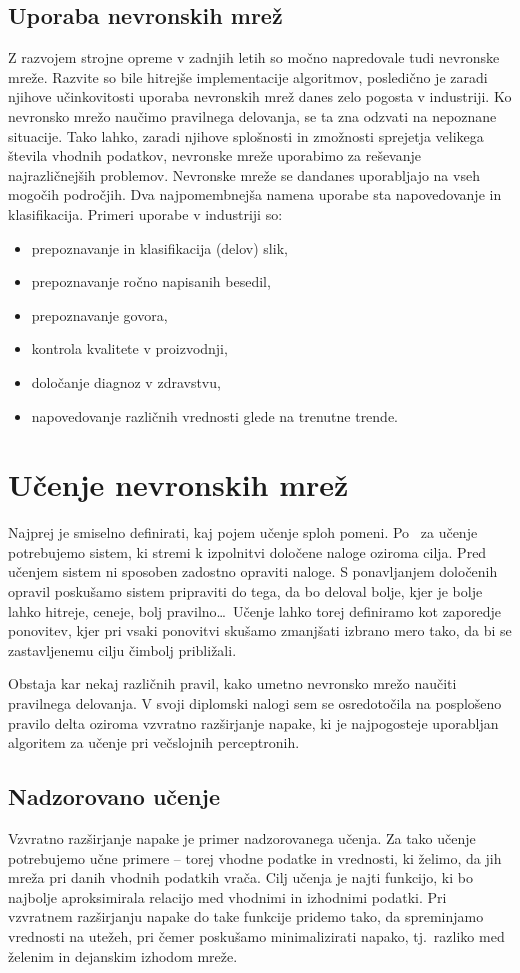 \documentclass[mat1]{fmfdelo}
\begin{document}
\subsection{Uporaba nevronskih mrež}
Z razvojem strojne opreme v zadnjih letih so močno napredovale tudi nevronske mreže. Razvite so bile hitrejše implementacije algoritmov, posledično je zaradi njihove učinkovitosti uporaba nevronskih mrež danes zelo pogosta v industriji. Ko nevronsko mrežo naučimo pravilnega delovanja, se ta zna odzvati na nepoznane situacije. Tako lahko, zaradi njihove splošnosti in zmožnosti sprejetja velikega števila vhodnih podatkov, nevronske mreže uporabimo za reševanje najrazličnejših problemov. Nevronske mreže se dandanes uporabljajo na vseh mogočih področjih. Dva najpomembnejša namena uporabe sta napovedovanje in klasifikacija. Primeri uporabe v industriji so: 
\begin{itemize}
\item prepoznavanje in klasifikacija (delov) slik,
\item prepoznavanje ročno napisanih besedil,
\item prepoznavanje govora,
\item kontrola kvalitete v proizvodnji,
\item določanje diagnoz v zdravstvu,
\item napovedovanje različnih vrednosti glede na trenutne trende.
\end{itemize}
%
\section{Učenje nevronskih mrež}
Najprej je smiselno definirati, kaj pojem učenje sploh pomeni. Po~\cite[str.~37]{kononenko} za učenje potrebujemo sistem, ki stremi k izpolnitvi določene naloge oziroma cilja. Pred učenjem sistem ni sposoben zadostno opraviti naloge. S ponavljanjem določenih opravil poskušamo sistem pripraviti do tega, da bo deloval bolje, kjer je bolje lahko hitreje, ceneje, bolj pravilno\ldots\ Učenje lahko torej definiramo kot zaporedje ponovitev, kjer pri vsaki ponovitvi skušamo zmanjšati izbrano mero tako, da bi se zastavljenemu cilju čimbolj približali. 

Obstaja kar nekaj različnih pravil, kako umetno nevronsko mrežo naučiti pravilnega delovanja. V svoji diplomski nalogi sem se osredotočila na posplošeno pravilo delta oziroma vzvratno razširjanje napake, ki je najpogosteje uporabljan algoritem za učenje pri večslojnih perceptronih. 
%
\subsection{Nadzorovano učenje}
Vzvratno razširjanje napake je primer nadzorovanega učenja. Za tako učenje potrebujemo učne primere -- torej vhodne podatke in vrednosti, ki želimo, da jih mreža pri danih vhodnih podatkih vrača. Cilj učenja je najti funkcijo, ki bo najbolje aproksimirala relacijo med vhodnimi in izhodnimi podatki. Pri vzvratnem razširjanju napake do take funkcije pridemo tako, da spreminjamo vrednosti na utežeh, pri čemer poskušamo minimalizirati napako, tj.\ razliko med želenim in dejanskim izhodom mreže.
\end{document}
